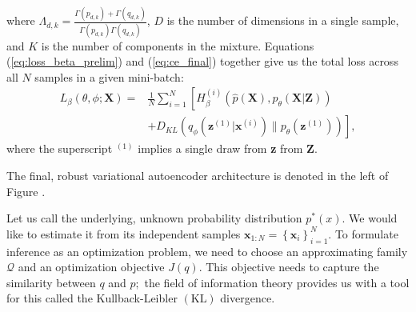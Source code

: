 where $\Lambda_{d,k} = \frac{\Gamma(p_{d,k}) + \Gamma(q_{d,k})}{\Gamma(p_{d,k})\Gamma(q_{d,k})}$, $D$ is the number of dimensions in a single sample, and $K$ is the number of components in the mixture. Equations (\ref{eq:loss_beta_prelim}) and (\ref{eq:ce_final}) together give us the total loss across all $N$ samples in a given mini-batch:
\begin{align}
L_{\beta}\left(\theta, \phi ; \mathbf{X}\right) = &\frac{1}{N}\sum_{i=1}^{N} \left[H_{\beta}^{(i)}(\hat{p}(\mathbf{X}),p_{\theta}(\mathbf{X} | \mathbf{Z})) \right. \nonumber \\
& \left. + D_{K L}\left(q_{\phi}\left(\mathbf{z}^{(1)} | \mathbf{x}^{(i)}\right) \| p_{\theta}(\mathbf{z}^{(1)})\right)\right], \label{eq:loss_beta_final}
\end{align}
where the superscript $^{(1)}$ implies a single draw from \textbf{z} from \textbf{Z}.

\iffalse
Using empirical estimates of expectation we form the Stochastic Gradient Variational Bayes (SGVB) \citep{sgvb}:
\begin{align}
L_{\beta}\left(\theta, \phi ; \mathbf{x}^{(i)}\right) \approx &\frac{1}{S}\sum_{j=1}^{S}H_{\beta}^{(i)}(\hat{p}(\mathbf{X}),p_{\theta}(\mathbf{X} | \mathbf{z}^{(j)})) \nonumber \\
&+ D_{K L}\left(q_{\phi}\left(\mathbf{Z} | \mathbf{x}^{(i)}\right) \| p_{\theta}(\mathbf{Z})\right),
\end{align}
where $S$ is the number of samples drawn from $q_{\phi}\left(\mathbf{Z} | \mathbf{X}}\right)$. In practice we pick $S=1$; as long as the minibatch size is large enough, this is a good approximation
We pick $\beta$ to be \tcr{xxx} by trial and error. 
\fi

The final, robust variational autoencoder architecture is denoted in the left of Figure \tcr{\ref{fig:rvae_plus_mdn}}.

\iffalse
\begin{figure*}
    \centering
    \texttt{[image: vae.png]}
    \caption{Caption}
    \label{fig:rvae}
\end{figure*}
\fi



\iffalse
Let us call the underlying, unknown probability distribution $p^{*}(x)$. We would like to estimate it from its independent samples $\mathbf{x}_{1: N}=\left\{\mathbf{x}_{i}\right\}_{i=1}^{N} .$ To formulate inference as an optimization problem, we need to choose an approximating family $\mathcal{Q}$ and an optimization objective $J(q) .$ This objective needs to capture the similarity between $q$ and $p ;$ the field of information theory provides us with a tool for this called the Kullback-Leibler $(\mathrm{KL})$ divergence.

